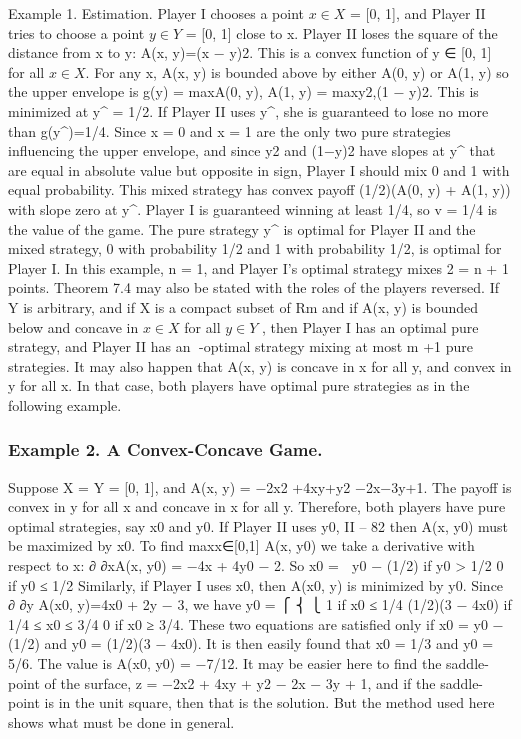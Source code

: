 \documentclass[]{report}
\begin{document}
Example 1. Estimation. Player I chooses a point $x \in X$ = [0, 1], and Player II
tries to choose a point $y \in Y$ = [0, 1] close to x. Player II loses the square of the distance
from x to y: A(x, y)=(x − y)2. This is a convex function of y ∈ [0, 1] for all $x \in X$.
For any x, A(x, y) is bounded above by either A(0, y) or A(1, y) so the upper envelope
is g(y) = max{A(0, y), A(1, y)} = max{y2,(1 − y)2}. This is minimized at y^{\ast} = 1/2. If
Player II uses y^{\ast}, she is guaranteed to lose no more than g(y^{\ast})=1/4.
Since x = 0 and x = 1 are the only two pure strategies influencing the upper envelope,
and since y2 and (1−y)2 have slopes at y^{\ast} that are equal in absolute value but opposite in
sign, Player I should mix 0 and 1 with equal probability. This mixed strategy has convex
payoff (1/2)(A(0, y) + A(1, y)) with slope zero at y^{\ast}. Player I is guaranteed winning at
least 1/4, so v = 1/4 is the value of the game. The pure strategy y^{\ast} is optimal for Player
II and the mixed strategy, 0 with probability 1/2 and 1 with probability 1/2, is optimal for
Player I. In this example, n = 1, and Player I’s optimal strategy mixes 2 = n + 1 points.
Theorem 7.4 may also be stated with the roles of the players reversed. If Y is arbitrary,
and if X is a compact subset of Rm and if A(x, y) is bounded below and concave in $x \in X$
for all $y \in Y$ , then Player I has an optimal pure strategy, and Player II has an -optimal
strategy mixing at most m +1 pure strategies. It may also happen that A(x, y) is concave
in x for all y, and convex in y for all x. In that case, both players have optimal pure
strategies as in the following example.
\subsubsection{Example 2. A Convex-Concave Game.} Suppose X = Y = [0, 1], and A(x, y) =
−2x2 +4xy+y2 −2x−3y+1. The payoff is convex in y for all x and concave in x for all y.
Therefore, both players have pure optimal strategies, say x0 and y0. If Player II uses y0,
II – 82
then A(x, y0) must be maximized by x0. To find maxx∈[0,1] A(x, y0) we take a derivative
with respect to x: ∂
∂xA(x, y0) = −4x + 4y0 − 2. So
x0 =
 y0 − (1/2) if y0 > 1/2
0 if y0 ≤ 1/2
Similarly, if Player I uses x0, then A(x0, y) is minimized by y0. Since ∂
∂y A(x0, y)=4x0 +
2y − 3, we have
y0 =
⎧
⎨
⎩
1 if x0 ≤ 1/4
(1/2)(3 − 4x0) if 1/4 ≤ x0 ≤ 3/4
0 if x0 ≥ 3/4.
These two equations are satisfied only if x0 = y0 − (1/2) and y0 = (1/2)(3 − 4x0). It is
then easily found that x0 = 1/3 and y0 = 5/6. The value is A(x0, y0) = −7/12.
It may be easier here to find the saddle-point of the surface, z = −2x2 + 4xy + y2 −
2x − 3y + 1, and if the saddle-point is in the unit square, then that is the solution. But
the method used here shows what must be done in general.
\end{document}
